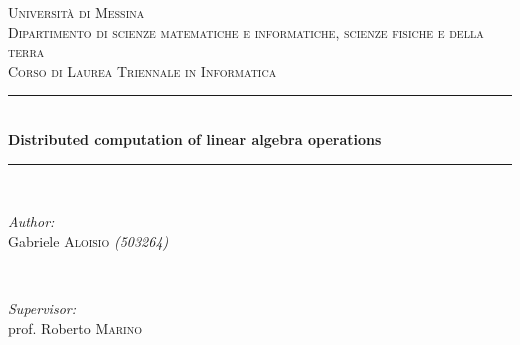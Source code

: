 \lstset{style=mystyle}


\begin{titlepage}

    \newcommand{\HRule}{\rule{\linewidth}{0.5mm}} %

    \center %


    \textsc{\LARGE Università di Messina}\\[1.5cm] %
    \textsc{\Large Dipartimento di scienze matematiche e informatiche, scienze fisiche e della terra}\\[0.5cm] %
    \textsc{\large Corso di Laurea Triennale in Informatica}\\[0.5cm] %


    \HRule \\[0.4cm]
    { \huge \bfseries Distributed computation of linear algebra operations}\\[0.4cm] %
    \HRule \\[1.5cm]


    \begin{minipage}{0.4\textwidth}
        \begin{flushleft} \large
            \emph{Author:}\\
            Gabriele \textsc{Aloisio} \textit{(503264)} \\
        \end{flushleft}
    \end{minipage}
    ~
    \begin{minipage}{0.4\textwidth}
        \begin{flushright} \large
            \emph{Supervisor:} \\
            prof. Roberto \textsc{Marino} \\
        \end{flushright}
    \end{minipage}\\[2cm]


\end{titlepage}
